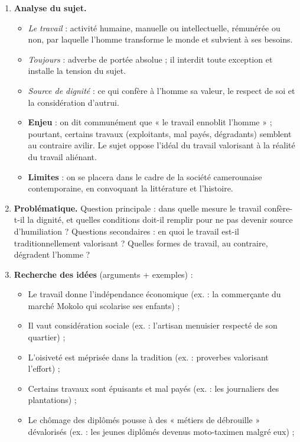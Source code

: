 \documentclass[11pt]{article}
\begin{document}
\begin{corrige}
\begin{enumerate}
\item \textbf{Analyse du sujet.}
\begin{itemize}
\item \emph{Le travail} : activité humaine, manuelle ou intellectuelle, rémunérée ou non, par laquelle l'homme transforme le monde et subvient à ses besoins.
\item \emph{Toujours} : adverbe de portée absolue ; il interdit toute exception et installe la tension du sujet.
\item \emph{Source de dignité} : ce qui confère à l'homme sa valeur, le respect de soi et la considération d'autrui.
\item \textbf{Enjeu} : on dit communément que « le travail ennoblit l'homme » ; pourtant, certains travaux (exploitants, mal payés, dégradants) semblent au contraire avilir. Le sujet oppose l'idéal du travail valorisant à la réalité du travail aliénant.
\item \textbf{Limites} : on se placera dans le cadre de la société camerounaise contemporaine, en convoquant la littérature et l'histoire.
\end{itemize}
\item \textbf{Problématique.} Question principale : dans quelle mesure le travail confère-t-il la dignité, et quelles conditions doit-il remplir pour ne pas devenir source d'humiliation ? Questions secondaires : en quoi le travail est-il traditionnellement valorisant ? Quelles formes de travail, au contraire, dégradent l'homme ?
\item \textbf{Recherche des idées} (arguments + exemples) :
\begin{itemize}
\item Le travail donne l'indépendance économique (ex. : la commerçante du marché Mokolo qui scolarise ses enfants) ;
\item Il vaut considération sociale (ex. : l'artisan menuisier respecté de son quartier) ;
\item L'oisiveté est méprisée dans la tradition (ex. : proverbes valorisant l'effort) ;
\item Certains travaux sont épuisants et mal payés (ex. : les journaliers des plantations) ;
\item Le chômage des diplômés pousse à des « métiers de débrouille » dévalorisés (ex. : les jeunes diplômés devenus moto-taximen malgré eux) ;

\end{itemize}
\end{enumerate}
\end{corrige}
\end{document}
